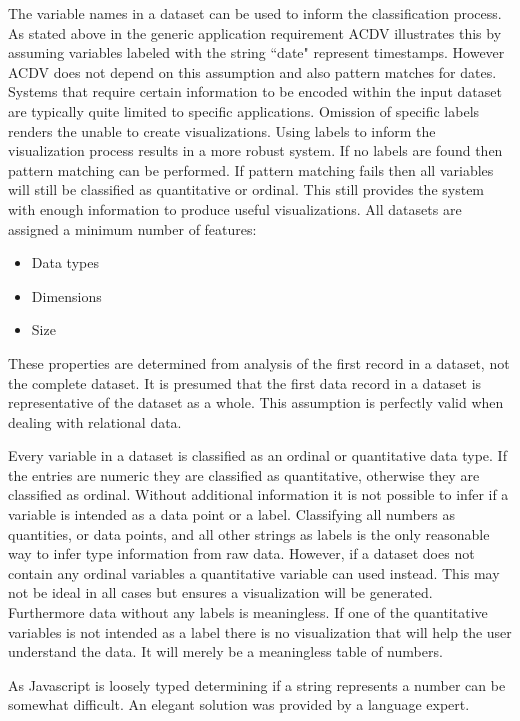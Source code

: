 \documentclass[a4paper, 11pt, titlepage, onehalfspacing]{report}
\begin{document}
The variable names in a dataset can be used to inform the classification process. As stated above in the generic application requirement AC\lightning{}DV illustrates this by assuming variables labeled with the string ``date" represent timestamps. However AC\lightning{}DV does not depend on this assumption and also pattern matches for dates. Systems that require certain information to be encoded within the input dataset are typically quite limited to specific applications. Omission of specific labels renders the unable to create visualizations. Using labels to inform the visualization process results in a more robust system. If no labels are found then pattern matching can be performed. If pattern matching fails then all variables will still be classified as quantitative or ordinal. This still provides the system with enough information to produce useful visualizations. All datasets are assigned a minimum number of features:
\begin{itemize}
\item Data types
\item Dimensions
\item Size
\end{itemize}
These properties are determined from analysis of the first record in a dataset, not the complete dataset. It is presumed that the first data record in a dataset is representative of the dataset as a whole. This assumption is perfectly valid when dealing with relational data.

Every variable in a dataset is classified as an ordinal or quantitative data type. If the entries are numeric they are classified as quantitative, otherwise they are classified as ordinal. Without additional information it is not possible to infer if a variable is intended as a data point or a label. Classifying all numbers as quantities, or data points, and all other strings as labels is the only reasonable way to infer type information from raw data. However, if a dataset does not contain any ordinal variables a quantitative variable can used instead. This may not be ideal in all cases but ensures a visualization will be generated. Furthermore data without any labels is meaningless. If one of the quantitative variables is not intended as a label there is no visualization that will help the user understand the data. It will merely be a meaningless table of numbers.

As Javascript is loosely typed determining if a string represents a number can be somewhat difficult. An elegant solution was provided by a language expert.
\end{document}

